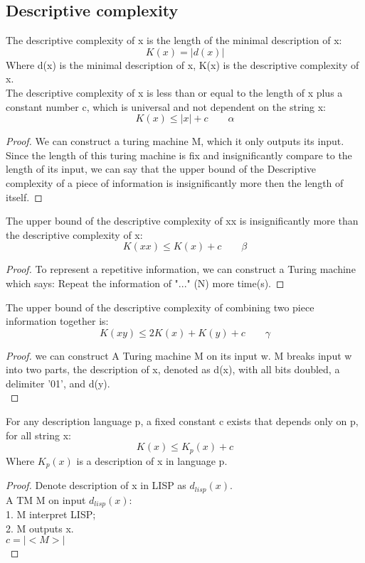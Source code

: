 \documentclass[12pt]{article}
\begin{document}
\subsection{Descriptive complexity}
The descriptive complexity of x is the length of the minimal description of x:
\[
	K(x)=|d(x)|
\]
Where d(x) is the minimal description of x, K(x) is the descriptive complexity of x.\\

The descriptive complexity of x is less than or equal to the length of x plus a constant number c, which is universal and not dependent on the string x:
\[
	K(x) \leq |x| + c \qquad \alpha
\]

\begin{proof}
We can construct a turing machine M, which it only outputs its input. 
Since the length of this turing machine is fix and insignificantly compare to the length of its input, we can say that the upper bound of the Descriptive complexity of a piece of information is insignificantly more then the length of itself.
\end{proof}


The upper bound of the descriptive complexity of xx is insignificantly more than the descriptive complexity of x:
\[
	K(xx) \leq K(x) + c \qquad \beta
\]

\begin{proof}
To represent a repetitive information, we can construct a Turing machine which says: Repeat the information of "..." (N) more time(s).
\end{proof}

The upper bound of the descriptive complexity of combining two piece information together is:
\[
	 K(xy) \leq 2K(x) + K(y) + c \qquad \gamma
\]

\begin{proof}
we can construct A Turing machine M on its input w. M breaks input w into two parts, the description of x, denoted as d(x), with all bits doubled, a delimiter '01', and d(y).\\
\end{proof}

For any description language p, a fixed constant c exists that depends only on p, for all string x:
\[
	K(x) \leq K_p(x) + c
\]
Where $K_p(x)$ is a description of x in language p.\\
\begin{proof}
Denote description of x in LISP as $d_{lisp}(x)$.\\
A TM M on input $d_{lisp}(x)$:\\
    1. M interpret LISP;\\
    2. M outputs x.\\
$c = |<M>|$\\
\end{proof}
\end{document}
